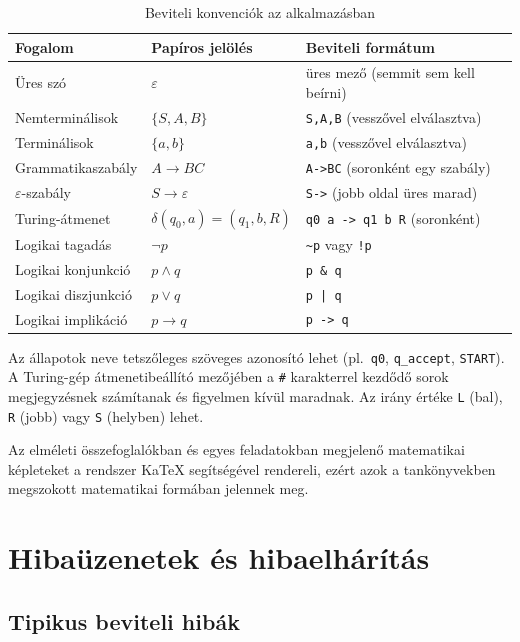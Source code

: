 \begin{itemize}
\begin{table}[H]
\centering
\begin{tabular}{p{} p{} p{}}
\toprule
\textbf{Fogalom} & \textbf{Papíros jelölés} & \textbf{Beviteli formátum} \\
\midrule
Üres szó & $\varepsilon$ & üres mező (semmit sem kell beírni) \\
Nemterminálisok & $\{S, A, B\}$ & \texttt{S,A,B} (vesszővel elválasztva) \\
Terminálisok & $\{a, b\}$ & \texttt{a,b} (vesszővel elválasztva) \\
Grammatikaszabály & $A \to BC$ & \texttt{A->BC} (soronként egy szabály) \\
$\varepsilon$-szabály & $S \to \varepsilon$ & \texttt{S->} (jobb oldal üres marad) \\
Turing-átmenet & $\delta(q_0, a) = (q_1, b, R)$ & \texttt{q0 a -> q1 b R} (soronként) \\
Logikai tagadás & $\lnot p$ & \texttt{\textasciitilde{}p} vagy \texttt{!p} \\
Logikai konjunkció & $p \land q$ & \texttt{p \& q} \\
Logikai diszjunkció & $p \lor q$ & \texttt{p | q} \\
Logikai implikáció & $p \to q$ & \texttt{p -> q} \\
\bottomrule
\end{tabular}
\caption{Beviteli konvenciók az alkalmazásban}
\label{tab:jeloelesek}
\end{table}

Az állapotok neve tetszőleges szöveges azonosító lehet (pl.\ \texttt{q0}, \texttt{q\_accept}, \texttt{START}). A Turing-gép átmenetibeállító mezőjében a \texttt{\#} karakterrel kezdődő sorok megjegyzésnek számítanak és figyelmen kívül maradnak. Az irány értéke \texttt{L} (bal), \texttt{R} (jobb) vagy \texttt{S} (helyben) lehet.

Az elméleti összefoglalókban és egyes feladatokban megjelenő matematikai képleteket a rendszer KaTeX segítségével rendereli,
 ezért azok a tankönyvekben megszokott matematikai formában jelennek meg.

\section{Hibaüzenetek és hibaelhárítás}

\subsection{Tipikus beviteli hibák}


\end{itemize}
